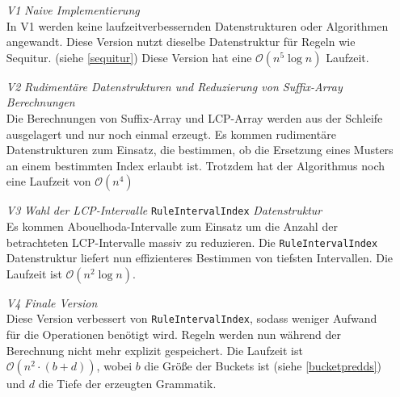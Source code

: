 \begin{itemize}
    \item[\emph{V1}] \emph{Naive Implementierung}\\
    In V1 werden keine laufzeitverbessernden Datenstrukturen oder Algorithmen angewandt.
    Diese Version nutzt dieselbe Datenstruktur für Regeln wie Sequitur. (siehe \autoref{sequitur}) Diese Version hat eine $\mathcal{O}(n^5 \log n)$ Laufzeit.
    \item[\emph{V2}] \emph{Rudimentäre Datenstrukturen und Reduzierung von Suffix-Array Berechnungen}\\
    Die Berechnungen von Suffix-Array und LCP-Array werden aus der Schleife ausgelagert und nur noch einmal erzeugt. Es kommen rudimentäre Datenstrukturen zum Einsatz, die bestimmen, ob die Ersetzung eines Musters an einem bestimmten Index erlaubt ist. Trotzdem hat der Algorithmus noch eine Laufzeit von $\mathcal{O}(n^4)$  
    \item[\emph{V3}] \emph{Wahl der LCP-Intervalle} \texttt{RuleIntervalIndex} \emph{Datenstruktur}\\
    Es kommen Abouelhoda-Intervalle zum Einsatz um die Anzahl der betrachteten LCP-Intervalle massiv zu reduzieren. Die \texttt{RuleIntervalIndex} Datenstruktur liefert nun effizienteres Bestimmen von tiefsten Intervallen. Die Laufzeit ist $\mathcal{O}(n^2 \log n)$.
    \item[\emph{V4}] \emph{Finale Version}\\
    Diese Version verbessert von \texttt{RuleIntervalIndex}, sodass weniger Aufwand für die Operationen benötigt wird. Regeln werden nun während der Berechnung nicht mehr  explizit gespeichert. Die Laufzeit ist $\mathcal{O}(n^2 \cdot (b + d))$, wobei $b$ die Größe der Buckets ist (siehe \autoref{bucketpredds}) und $d$ die Tiefe der erzeugten Grammatik.
\end{itemize}

\newpage

\newpage

\newpage

\newpage

\newpage
